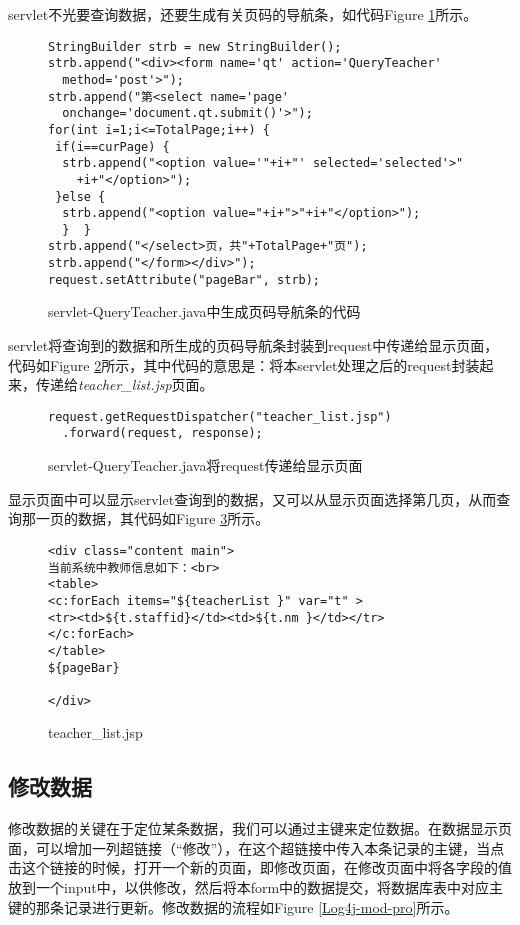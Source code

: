 servlet不光要查询数据，还要生成有关页码的导航条，如代码Figure \ref{Log4j-navi}所示。


\begin{figure}
\begin{verbatim}
StringBuilder strb = new StringBuilder();
strb.append("<div><form name='qt' action='QueryTeacher' 
  method='post'>");
strb.append("第<select name='page'  
  onchange='document.qt.submit()'>");
for(int i=1;i<=TotalPage;i++) {
 if(i==curPage) {
  strb.append("<option value='"+i+"' selected='selected'>"
    +i+"</option>");
 }else {
  strb.append("<option value="+i+">"+i+"</option>");
  }  }
strb.append("</select>页，共"+TotalPage+"页");
strb.append("</form></div>");
request.setAttribute("pageBar", strb);
\end{verbatim}
\caption{servlet-QueryTeacher.java中生成页码导航条的代码}
\label{Log4j-navi}
\end{figure}


servlet将查询到的数据和所生成的页码导航条封装到request中传递给显示页面，代码如Figure \ref{Log4j-servv}所示，其中代码的意思是：将本servlet处理之后的request封装起来，传递给\emph{teacher\_list.jsp}页面。
\begin{figure}
\begin{verbatim}
request.getRequestDispatcher("teacher_list.jsp")
  .forward(request, response);
\end{verbatim}
\caption{servlet-QueryTeacher.java将request传递给显示页面}
\label{Log4j-servv}
\end{figure}

显示页面中可以显示servlet查询到的数据，又可以从显示页面选择第几页，从而查询那一页的数据，其代码如Figure \ref{Log4j-list}所示。

\begin{figure}
\begin{verbatim}
<div class="content main">
当前系统中教师信息如下：<br>
<table>
<c:forEach items="${teacherList }" var="t" >
<tr><td>${t.staffid}</td><td>${t.nm }</td></tr>
</c:forEach>
</table>
${pageBar}

</div>
\end{verbatim}
\caption{teacher\_list.jsp}
\label{Log4j-list}
\end{figure}
\subsection{修改数据}
修改数据的关键在于定位某条数据，我们可以通过主键来定位数据。在数据显示页面，可以增加一列超链接（“修改”），在这个超链接中传入本条记录的主键，当点击这个链接的时候，打开一个新的页面，即修改页面，在修改页面中将各字段的值放到一个input中，以供修改，然后将本form中的数据提交，将数据库表中对应主键的那条记录进行更新。修改数据的流程如Figure \ref{Log4j-mod-pro}所示。

